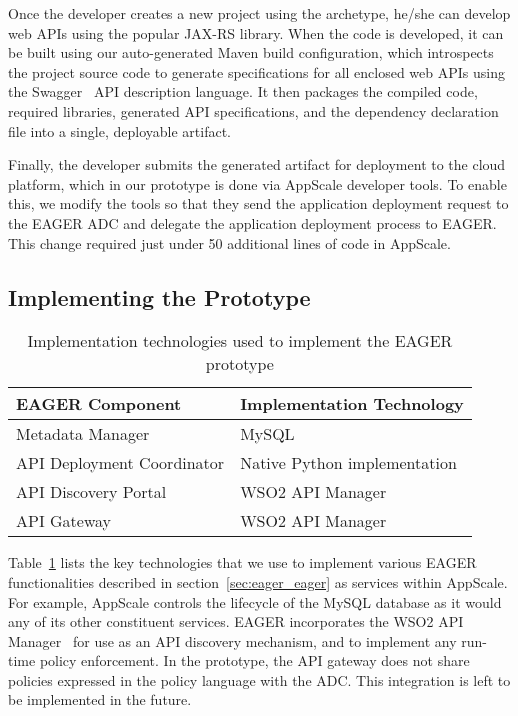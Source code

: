 Once the developer creates a new project using the archetype, he/she can develop
web APIs using the popular JAX-RS library. When the code is developed, it can be built
using our auto-generated Maven build configuration, which introspects the
project source code to generate specifications for all enclosed web APIs using
the Swagger~\cite{swagger} API description language. 
It then packages the compiled
code, required libraries, generated API specifications, and the dependency
declaration file into a single, deployable artifact.

Finally, the developer submits the generated artifact for deployment to the
cloud platform, which in our prototype is done via AppScale developer tools. 
To enable this, we modify the tools so that they
send the application deployment request to the EAGER ADC and
delegate the application deployment process to EAGER. This change required
just under 50 additional lines of code in AppScale.

\subsection{Implementing the Prototype}

\begin{table}[t]
\begin{center}
\begin{tabular}{| p{6cm} | p{7cm} |}
\hline
EAGER Component & Implementation Technology\\ \hline
Metadata Manager & MySQL\\
API Deployment Coordinator & Native Python implementation\\
API Discovery Portal & WSO2 API Manager~\cite{wso2apimgr}\\
API Gateway & WSO2 API Manager\\
\hline
\end{tabular}
\end{center}
\caption{Implementation technologies used to implement the EAGER prototype}
\label{tab:imp-tech}
\end{table}

Table~\ref{tab:imp-tech} lists the key technologies that we use to implement 
various EAGER functionalities described in
section~\ref{sec:eager_eager} as services within AppScale.  For example, AppScale
controls the lifecycle of the MySQL database as it would any of its other
constituent services.  EAGER incorporates the WSO2 API Manager~\cite{wso2am} for
use as an API discovery mechanism, and to implement any run-time policy 
enforcement.  In the prototype, the API gateway does not share policies
expressed in the policy language with the ADC. This integration is left to
be implemented in the future.

